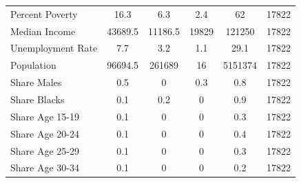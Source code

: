 \begin{table}[htbp]
\begin{tabular}{l c c c c c}
Percent Poverty & 16.3 & 6.3 & 2.4 & 62 & 17822\\
Median Income & 43689.5 & 11186.5 & 19829 & 121250 & 17822\\
Unemployment Rate & 7.7 & 3.2 & 1.1 & 29.1 & 17822\\
Population & 96694.5 & 261689 & 16 & 5151374 & 17822\\
Share Males & 0.5 & 0 & 0.3 & 0.8 & 17822\\
Share Blacks & 0.1 & 0.2 & 0 & 0.9 & 17822\\
Share Age 15-19 & 0.1 & 0 & 0 & 0.3 & 17822\\
Share Age 20-24 & 0.1 & 0 & 0 & 0.4 & 17822\\
Share Age 25-29 & 0.1 & 0 & 0 & 0.3 & 17822\\
Share Age 30-34 & 0.1 & 0 & 0 & 0.2 & 17822\\
\hline\end{tabular}
\end{table}
